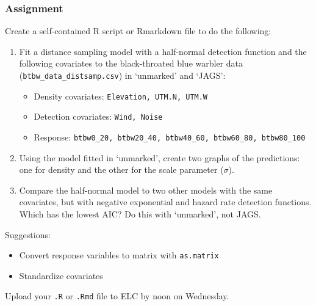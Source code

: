 \documentclass[color=usenames,dvipsnames]{beamer}\usepackage[]{graphicx}\usepackage[]{xcolor}
\newcommand{\inr}[1]{\colorbox{inlinecolor}{\texttt{#1}}}
\begin{document}
\begin{frame}[fragile]
  \frametitle{Assignment}
  \footnotesize
  Create a self-contained R script or Rmarkdown file to do the following:
  \vfill
  \begin{enumerate}
    \footnotesize
    \item Fit a distance sampling model with a half-normal detection
      function and the following covariates to the black-throated blue
      warbler data ({\tt btbw\_data\_distsamp.csv}) in `unmarked' and
      `JAGS':   
      \begin{itemize}
        \footnotesize
        \item Density covariates: {\tt Elevation, UTM.N, UTM.W}
        \item Detection covariates: {\tt Wind, Noise}
        \item Response: {\scriptsize \tt btbw0\_20, btbw20\_40, btbw40\_60, btbw60\_80, btbw80\_100}
      \end{itemize}
    \item Using the model fitted in `unmarked', create two graphs of
      the predictions: one for density and the other for the scale
      parameter ($\sigma$).
    \item Compare the half-normal model to two other models with the
      same covariates, but with negative exponential and hazard
      rate detection functions. Which has the lowest AIC? Do this with
      `unmarked', not JAGS.  
  \end{enumerate}
  \vfill
  Suggestions:
  \begin{itemize}
    \item Convert response variables to matrix with \inr{as.matrix}
    \item Standardize covariates
  \end{itemize}
  \vfill
  Upload your {\tt .R} or {\tt .Rmd} file to ELC by noon on Wednesday. 
\end{frame}
\end{document}
